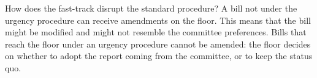 \documentclass[letter,12pt]{article}
\begin{document}

How does the fast-track disrupt the standard procedure? A bill not under the urgency procedure can receive amendments on the floor. This means that the bill might be modified and might not resemble the committee preferences. Bills that reach the floor under an urgency procedure cannot be amended: the floor decides on whether to adopt the report coming from the committee, or to keep the status quo. 

\end{document}

